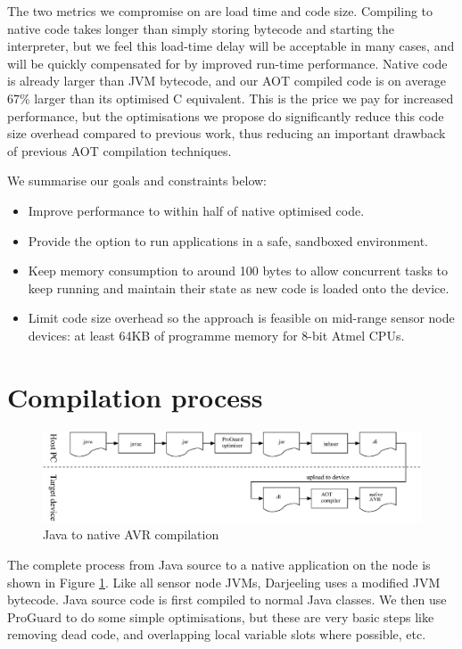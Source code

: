 The two metrics we compromise on are load time and code size. Compiling to native code takes longer than simply storing bytecode and starting the interpreter, but we feel this load-time delay will be acceptable in many cases, and will be quickly compensated for by improved run-time performance. Native code is already larger than JVM bytecode, and our AOT compiled code is on average 67\% larger than its optimised C equivalent. This is the price we pay for increased performance, but the optimisations we propose do significantly reduce this code size overhead compared to previous work, thus reducing an important drawback of previous AOT compilation techniques.

We summarise our goals and constraints below:
\begin{itemize}
  \item Improve performance to within half of native optimised code.
  \item Provide the option to run applications in a safe, sandboxed environment.
  \item Keep memory consumption to around 100 bytes to allow concurrent tasks to keep running and maintain their state as new code is loaded onto the device.
  \item Limit code size overhead so the approach is feasible on mid-range sensor node devices: at least 64KB of programme memory for 8-bit Atmel CPUs.
\end{itemize}

\section{Compilation process}
\label{sec-compilation-process}

\begin{figure}
\includegraphics[width=\linewidth]{compilation-process.eps}
\caption{Java to native AVR compilation}
\label{fig-translation-process}
\end{figure}

The complete process from Java source to a native application on the node is shown in Figure \ref{fig-translation-process}. Like all sensor node JVMs, Darjeeling uses a modified JVM bytecode. Java source code is first compiled to normal Java classes. We then use ProGuard \cite{proguard} to do some simple optimisations, but these are very basic steps like removing dead code, and overlapping local variable slots where possible, etc.

